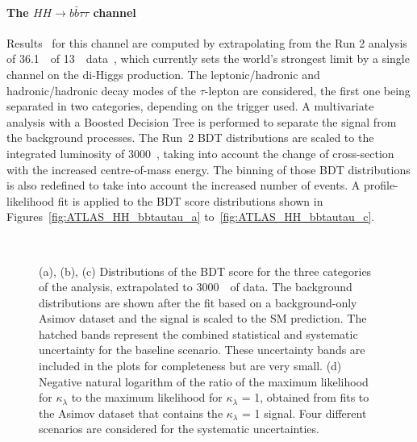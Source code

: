 
%
\paragraph{The $HH \rightarrow b\bar{b}\tau\tau$ channel}

Results~\cite{ATLASHHPUBnote} for this channel are computed by extrapolating from the Run 2 analysis of 36.1~\fbinv\ of 13~\TeV\ data~\cite{ATLASrun2HHbbtautau}, which currently sets the world's strongest limit by a single channel on the di-Higgs production. 
The leptonic/hadronic and hadronic/hadronic decay modes of the $\tau$-lepton are considered, the first one being separated in two categories, depending on the trigger used. A multivariate analysis with a Boosted Decision Tree is performed to separate the signal from the background processes. The Run~2 BDT distributions are scaled to the integrated luminosity of 3000~\fbinv, taking into account the change of cross-section with the increased centre-of-mass energy. The binning of those BDT distributions is also redefined to take into account the increased number of events.
A profile-likelihood fit is applied to the BDT score distributions shown in Figures~\ref{fig:ATLAS_HH_bbtautau_a} to~\ref{fig:ATLAS_HH_bbtautau_c}. 


\begin{figure}[!htb]
\centering 
{} 
\\
\caption{(a), (b), (c) Distributions of the BDT score for the three categories of the analysis, extrapolated to 3000~\fbinv\ of data. The background distributions are shown after the fit based on a background-only Asimov dataset and the signal is scaled to the SM prediction. The hatched bands represent the combined statistical and systematic uncertainty for the baseline scenario. These uncertainty bands are included in the plots for completeness but are very small. (d) Negative natural logarithm of the ratio of the maximum likelihood for $\kappa_{\lambda}$ to the maximum likelihood for $\kappa_{\lambda}$ = 1, obtained from fits to the Asimov dataset that contains the $\kappa_{\lambda}$ = 1 signal. Four different scenarios are considered for the systematic uncertainties.} 
\label{fig:ATLAS_HH_bbtautau} 
\end{figure}

